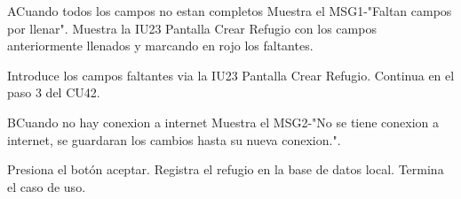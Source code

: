 \begin{UCtrayectoriaA}{A}{Cuando todos los campos no estan completos}
	\UCpaso Muestra el MSG1-"Faltan campos por llenar".
	\UCpaso Muestra la IU23 Pantalla Crear Refugio con los campos anteriormente llenados y marcando en rojo los faltantes.
	\item\UCactor Introduce los campos faltantes via la IU23 Pantalla Crear Refugio.
	\UCpaso Continua en el paso 3 del CU42.
\end{UCtrayectoriaA}

\begin{UCtrayectoriaA}{B}{Cuando no hay conexion a internet}
	\UCpaso Muestra el MSG2-"No se tiene conexion a internet, se guardaran los cambios hasta su nueva conexion.".
	\item\UCactor Presiona el botón aceptar.
	\UCpaso Registra el refugio en la base de datos local.	
	\UCpaso[] Termina el caso de uso.
\end{UCtrayectoriaA}